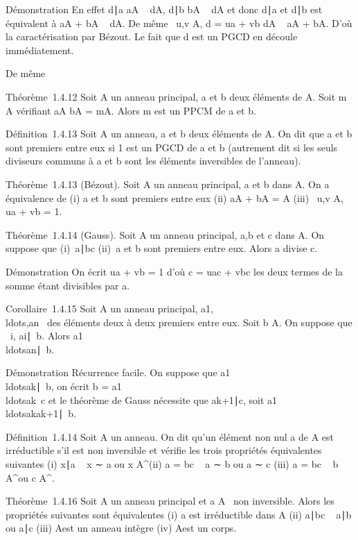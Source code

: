 Démonstration En effet d∣a
\Leftrightarrow aA \subset~ dA, d\mathrel∣b
\Leftrightarrow bA \subset~ dA et donc
d∣a et d\mathrel∣b est
équivalent à aA + bA \subset~ dA. De même \exists~u,v \in A, d
= ua + vb \Leftrightarrow dA \subset~ aA + bA. D'où la
caractérisation par Bézout. Le fait que d est un PGCD en découle
immédiatement.

De même

Théorème~1.4.12 Soit A un anneau principal, a et b deux éléments de A.
Soit m \in A vérifiant aA \bigcap bA = mA. Alors m est un PPCM de a et b.

Définition~1.4.13 Soit A un anneau, a et b deux éléments de A. On dit
que a et b sont premiers entre eux si 1 est un PGCD de a et b (autrement
dit si les seuls diviseurs communs à a et b sont les éléments
inversibles de l'anneau).

Théorème~1.4.13 (Bézout). Soit A un anneau principal, a et b dans A. On
a équivalence de (i) a et b sont premiers entre eux (ii) aA + bA = A
(iii) \exists~u,v \in A, ua + vb = 1.

Théorème~1.4.14 (Gauss). Soit A un anneau principal, a,b et c dans A. On
suppose que (i)~a∣bc (ii)~a et b sont
premiers entre eux. Alors a divise c.

Démonstration On écrit ua + vb = 1 d'où c = uac + vbc les deux termes de
la somme étant divisibles par a.

Corollaire~1.4.15 Soit A un anneau principal,
a1,\\ldots,an~
des éléments deux à deux premiers entre eux. Soit b \in A. On suppose que
\forall~i, ai\mathrel∣~b.
Alors
a1\\ldotsan\mathrel∣~b.

Démonstration Récurrence facile. On suppose que
a1\\ldotsak\mathrel∣~b,
on écrit b =
a1\\ldotsak~c
et le théorème de Gauss nécessite que
ak+1∣c, soit
a1\\ldotsakak+1\mathrel∣~b.

Définition~1.4.14 Soit A un anneau. On dit qu'un élément non nul a de A
est irréductible s'il est non inversible et vérifie les trois propriétés
équivalentes suivantes (i) x∣a \rigtharrow~ x ∼ a ou x \in
A^\times (ii) a = bc \rigtharrow~ a ∼ b ou a ∼ c (iii) a = bc \rigtharrow~ b \in
A^\times ou c \in A^\times.

Théorème~1.4.16 Soit A un anneau principal et a \in A
\diagdown\0\ non inversible. Alors les
propriétés suivantes sont équivalentes (i) a est irréductible dans A
(ii) a∣bc \rigtharrow~ a\mathrel∣b ou
a∣c (iii) A\diagupaA est un anneau intègre (iv)
A\diagupaA est un corps.

